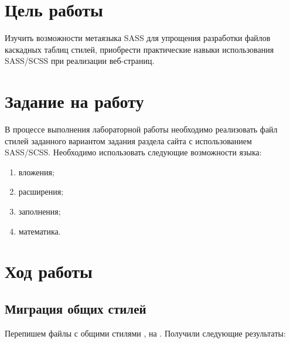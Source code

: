 \documentclass[a4paper,14pt]{extarticle}
\begin{document}


\section{Цель работы}
Изучить возможности метаязыка SASS для упрощения разработки
файлов каскадных таблиц стилей, приобрести практические навыки
использования SASS/SCSS при реализации веб-страниц.

\section{Задание на работу}
В процессе выполнения лабораторной работы необходимо реализовать
файл стилей заданного вариантом задания раздела сайта с использованием
SASS/SCSS. Необходимо использовать следующие возможности языка:
\begin{enumerate}
    \item вложения;
    \item расширения;
    \item заполнения;
    \item математика.
\end{enumerate}

\section{Ход работы}
\subsection{Миграция общих стилей}
Перепишем файлы с общими стилями , 
 на . Получили следующие результаты:
\end{document}
